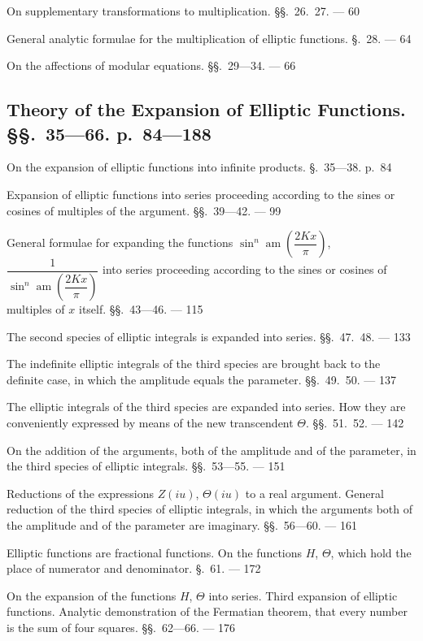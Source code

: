\documentclass{article}
\begin{document}
On supplementary transformations to multiplication. §§.\ 26.\ 27. --- 60

General analytic formulae for the multiplication of elliptic functions. §.\ 28. --- 64

On the affections of modular equations. §§.\ 29---34. --- 66


\subsection*{Theory of the Expansion of Elliptic Functions. §§.\ 35---66. p.\ 84---188}

On the expansion of elliptic functions into infinite products. §.\ 35---38. p.\ 84

Expansion of elliptic functions into series proceeding according to the sines or cosines of multiples of the argument. §§.\ 39---42. --- 99

General formulae for expanding the functions $\sin^{n}\operatorname{am}\left(\dfrac{2Kx}{\pi}\right)$, $\dfrac{1}{\sin^{n}\operatorname{am}\left(\dfrac{2Kx}{\pi}\right)}$ into series proceeding according to the sines or cosines of multiples of $x$ itself. §§.\ 43---46. --- 115

The second species of elliptic integrals is expanded into series. §§.\ 47.\ 48. --- 133

The indefinite elliptic integrals of the third species are brought back to the definite case, in which the amplitude equals the parameter. §§.\ 49.\ 50. --- 137

The elliptic integrals of the third species are expanded into series. How they are conveniently expressed by means of the new transcendent $\Theta$. §§.\ 51.\ 52. --- 142

On the addition of the arguments, both of the amplitude and of the parameter, in the third species of elliptic integrals. §§.\ 53---55. --- 151

Reductions of the expressions $Z(iu)$, $\Theta(iu)$ to a real argument. General reduction of the third species of elliptic integrals, in which the arguments both of the amplitude and of the parameter are imaginary. §§.\ 56---60. --- 161

Elliptic functions are fractional functions. On the functions $H$, $\Theta$, which hold the place of numerator and denominator. §.\ 61. --- 172

On the expansion of the functions $H$, $\Theta$ into series. Third expansion of elliptic functions. Analytic demonstration of the Fermatian theorem, that every number is the sum of four squares. §§.\ 62---66. --- 176
\end{document}
